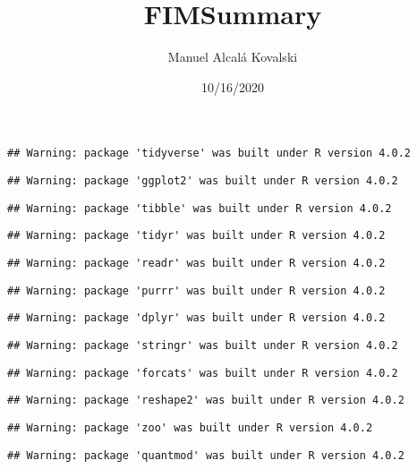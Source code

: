 \documentclass[
]{article}
\title{FIMSummary}
\author{Manuel Alcalá Kovalski}
\date{10/16/2020}
\begin{document}
\maketitle

\begin{verbatim}
## Warning: package 'tidyverse' was built under R version 4.0.2
\end{verbatim}

\begin{verbatim}
## Warning: package 'ggplot2' was built under R version 4.0.2
\end{verbatim}

\begin{verbatim}
## Warning: package 'tibble' was built under R version 4.0.2
\end{verbatim}

\begin{verbatim}
## Warning: package 'tidyr' was built under R version 4.0.2
\end{verbatim}

\begin{verbatim}
## Warning: package 'readr' was built under R version 4.0.2
\end{verbatim}

\begin{verbatim}
## Warning: package 'purrr' was built under R version 4.0.2
\end{verbatim}

\begin{verbatim}
## Warning: package 'dplyr' was built under R version 4.0.2
\end{verbatim}

\begin{verbatim}
## Warning: package 'stringr' was built under R version 4.0.2
\end{verbatim}

\begin{verbatim}
## Warning: package 'forcats' was built under R version 4.0.2
\end{verbatim}

\begin{verbatim}
## Warning: package 'reshape2' was built under R version 4.0.2
\end{verbatim}

\begin{verbatim}
## Warning: package 'zoo' was built under R version 4.0.2
\end{verbatim}

\begin{verbatim}
## Warning: package 'quantmod' was built under R version 4.0.2
\end{verbatim}
\end{document}
